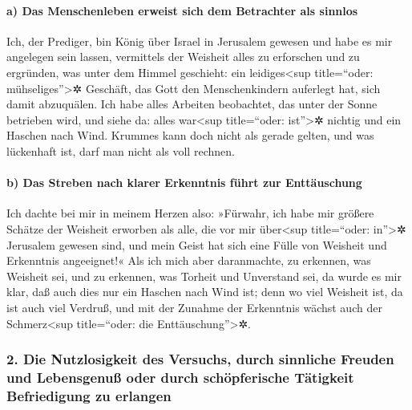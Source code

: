 \hypertarget{a-das-menschenleben-erweist-sich-dem-betrachter-als-sinnlos}{%
\paragraph{a) Das Menschenleben erweist sich dem Betrachter als
sinnlos}\label{a-das-menschenleben-erweist-sich-dem-betrachter-als-sinnlos}}

Ich, der Prediger, bin König über Israel in Jerusalem
gewesen und habe es mir angelegen sein lassen, vermittels
der Weisheit alles zu erforschen und zu ergründen, was unter dem Himmel
geschieht: ein leidiges\textless sup title=``oder:
mühseliges''\textgreater✲ Geschäft, das Gott den Menschenkindern
auferlegt hat, sich damit abzuquälen. Ich habe alles
Arbeiten beobachtet, das unter der Sonne betrieben wird, und siehe da:
alles war\textless sup title=``oder: ist''\textgreater✲ nichtig und ein
Haschen nach Wind. Krummes kann doch nicht als gerade
gelten, und was lückenhaft ist, darf man nicht als voll rechnen.

\hypertarget{b-das-streben-nach-klarer-erkenntnis-fuxfchrt-zur-enttuxe4uschung}{%
\paragraph{b) Das Streben nach klarer Erkenntnis führt zur
Enttäuschung}\label{b-das-streben-nach-klarer-erkenntnis-fuxfchrt-zur-enttuxe4uschung}}

Ich dachte bei mir in meinem Herzen also: »Fürwahr, ich
habe mir größere Schätze der Weisheit erworben als alle, die vor mir
über\textless sup title=``oder: in''\textgreater✲ Jerusalem gewesen
sind, und mein Geist hat sich eine Fülle von Weisheit und Erkenntnis
angeeignet!« Als ich mich aber daranmachte, zu erkennen,
was Weisheit sei, und zu erkennen, was Torheit und Unverstand sei, da
wurde es mir klar, daß auch dies nur ein Haschen nach Wind ist;
denn wo viel Weisheit ist, da ist auch viel Verdruß, und
mit der Zunahme der Erkenntnis wächst auch der Schmerz\textless sup
title=``oder: die Enttäuschung''\textgreater✲.

\hypertarget{die-nutzlosigkeit-des-versuchs-durch-sinnliche-freuden-und-lebensgenuuxdf-oder-durch-schuxf6pferische-tuxe4tigkeit-befriedigung-zu-erlangen}{%
\subsubsection{2. Die Nutzlosigkeit des Versuchs, durch sinnliche
Freuden und Lebensgenuß oder durch schöpferische Tätigkeit Befriedigung
zu
erlangen}\label{die-nutzlosigkeit-des-versuchs-durch-sinnliche-freuden-und-lebensgenuuxdf-oder-durch-schuxf6pferische-tuxe4tigkeit-befriedigung-zu-erlangen}}

